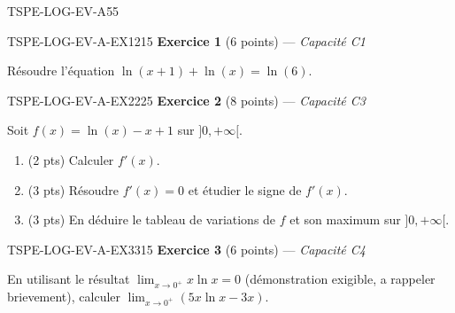 

\begin{evaluation}{TSPE-LOG-EV-A}{55}

\begin{exercice}{TSPE-LOG-EV-A-EX1}{2}{15}
\textbf{Exercice 1} (6 points) — \textit{Capacité C1}

\medskip

Résoudre l'équation $\ln(x+1) + \ln(x) = \ln(6)$.
\end{exercice}

\begin{exercice}{TSPE-LOG-EV-A-EX2}{2}{25}
\textbf{Exercice 2} (8 points) — \textit{Capacité C3}

\medskip

Soit $f(x) = \ln(x) - x + 1$ sur $]0, +\infty[$.
\begin{enumerate}
  \item (2 pts) Calculer $f'(x)$.
  \item (3 pts) Résoudre $f'(x)=0$ et étudier le signe de $f'(x)$.
  \item (3 pts) En déduire le tableau de variations de $f$ et son maximum sur $]0,+\infty[$.
\end{enumerate}
\end{exercice}

\begin{exercice}{TSPE-LOG-EV-A-EX3}{3}{15}
\textbf{Exercice 3} (6 points) — \textit{Capacité C4}

\medskip

En utilisant le résultat $\displaystyle\lim_{x\to0^+} x\ln x = 0$ (démonstration exigible, a rappeler brievement), calculer $\displaystyle\lim_{x \to 0^+} \left(5x\ln x - 3x\right)$.
\end{exercice}

\end{evaluation}
